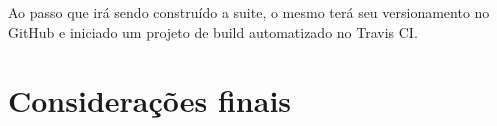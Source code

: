 \documentclass[
	article,			%
	12pt,				%
	oneside,			%
	a4paper,			%
	english,			
	brazil,
	sumario=tradicional
	]{abntex2}
\begin{document}
Ao passo que irá sendo construído a suite, o mesmo terá seu versionamento no GitHub e iniciado um projeto de build automatizado no Travis CI.

% 

\section*{Considerações finais}

\lipsum[1]

\begin{citacao}
\lipsum[2]
\end{citacao}

\lipsum[3]

\postextual


\nocite{cpluspluscom.1}
\nocite{testdrivendevelopment.1}


%
%







%
%
%
\end{document}
